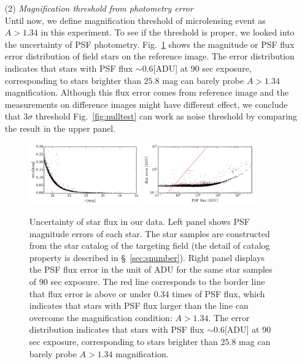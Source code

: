 \documentclass[iop, apj]{emulateapj}
\newcommand{\?}{\stackrel{?}{=}}
\begin{document}
\begin{itemize}
\item[(2)]{\it Magnification threshold from photometry error}\\ 
Until now, we define magnification threshold of microlensing event as $A>1.34$ in this experiment. 
To see if the threshold is proper, we looked into the uncertainty of PSF photometry. 
Fig.~\ref{fig:rsm} shows the magnitude or PSF flux error distribution of field stars on the reference image. The error distribution indicates that stars with PSF flux $\sim0.6$[ADU] at 90 sec exposure, corresponding to stars brighter than $25.8$ mag can barely probe $A>1.34$ magnification. Although this flux error comes from reference image and the measurements on difference images might have different effect, we conclude that $3\sigma$ threshold Fig.~\ref{fig:nulltest} can work as noise threshold by comparing the result in the upper panel. 
%
\begin{figure}
\centering
\includegraphics[width=0.45\textwidth]{pic/2,6_err_r.pdf}
\includegraphics[width=0.45\textwidth]{pic/2,6_err_r_flux.pdf}
\caption{\small{Uncertainty of star flux in our data. {Left panel} shows PSF magnitude errors of each star. The star samples are constructed from the star catalog of the targeting field (the detail of catalog property is described in \S~\ref{sec:snumber}). {Right panel} displays the PSF flux error in the unit of ADU for the same star samples of 90 sec exposure. The red line corresponds to the border line that flux error is above or under 0.34 times of PSF flux, which indicates that stars with PSF flux larger than the line can overcome the magnification condition: $A>1.34$. The error distribution indicates that stars with PSF flux $\sim0.6$[ADU] at 90 sec exposure, corresponding to stars brighter than $25.8$ mag can barely probe $A>1.34$ magnification.  }}
\label{fig:rsm}
\end{figure}
%


\end{itemize}
\end{document}
